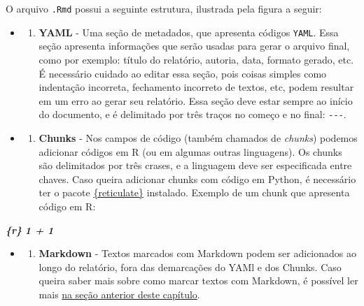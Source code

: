 \documentclass[
]{book}
\newenvironment{Shaded}{\begin{snugshade}}{\end{snugshade}}
\newcommand{\InformationTok}[1]{\textcolor[rgb]{0.56,0.35,0.01}{\textbf{\textit{#1}}}}
\providecommand{\tightlist}{%
  \setlength{\itemsep}{0pt}\setlength{\parskip}{0pt}}
\begin{document}
O arquivo \texttt{.Rmd} possui a seguinte estrutura, ilustrada pela figura a seguir:

\begin{itemize}
\item
  \begin{enumerate}
  \def\labelenumi{\arabic{enumi})}
  \tightlist
  \item
    \textbf{YAML} - Uma seção de metadados, que apresenta códigos \texttt{YAML}. Essa seção apresenta informações que serão usadas para gerar o arquivo final, como por exemplo: título do relatório, autoria, data, formato gerado, etc. É necessário cuidado ao editar essa seção, pois coisas simples como indentação incorreta, fechamento incorreto de textos, etc, podem resultar em um erro ao gerar seu relatório. Essa seção deve estar sempre ao início do documento, e é delimitado por três traços no começo e no final: \texttt{-\/-\/-}.
  \end{enumerate}
\item
  \begin{enumerate}
  \def\labelenumi{\arabic{enumi})}
  \setcounter{enumi}{1}
  \tightlist
  \item
    \textbf{Chunks} - Nos campos de código (também chamados de \emph{chunks}) podemos adicionar códigos em R (ou em algumas outras linguagens). Os chunks são delimitados por três crases, e a linguagem deve ser especificada entre chaves. Caso queira adicionar chunks com código em Python, é necessário ter o pacote \href{https://rstudio.github.io/reticulate/}{\{reticulate\}} instalado. Exemplo de um chunk que apresenta código em R:
  \end{enumerate}
\end{itemize}

\begin{Shaded}
\begin{Highlighting}[]
\InformationTok{\textasciigrave{}\textasciigrave{}\textasciigrave{}\{r\}}
\InformationTok{1 + 1 }
\InformationTok{\textasciigrave{}\textasciigrave{}\textasciigrave{}}
\end{Highlighting}
\end{Shaded}

\begin{itemize}
\item
  \begin{enumerate}
  \def\labelenumi{\arabic{enumi})}
  \setcounter{enumi}{2}
  \tightlist
  \item
    \textbf{Markdown} - Textos marcados com Markdown podem ser adicionados ao longo do relatório, fora das demarcações do YAMl e dos Chunks. Caso queira saber mais sobre como marcar textos com Markdown, é possível ler mais \protect\hyperlink{markdown}{na seção anterior deste capítulo}.
  \end{enumerate}
\end{itemize}
\end{document}
